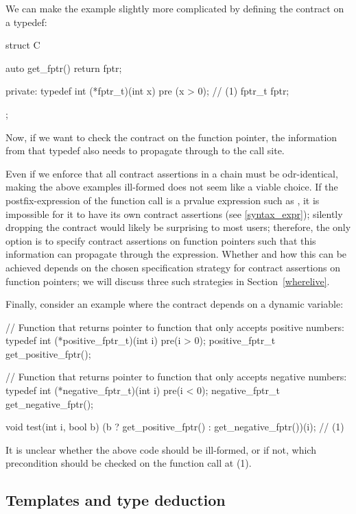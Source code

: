 We can make the example slightly more complicated by defining the contract on a typedef:
\begin{codeblock}
struct C {
  auto get_fptr() { return fptr; }
  
private:
  typedef int (*fptr_t)(int x) pre (x > 0);  // (1)
  fptr_t fptr;
};
\end{codeblock}
Now, if  we want to check the contract on the function pointer, the information from that typedef also needs to propagate through to the call site.

Even if we enforce that all contract assertions in a chain must be odr-identical, making the above examples ill-formed does not seem like a viable choice. If the postfix-expression of the function call is a prvalue expression such as , it is impossible for it to have its own contract assertions (see \ref{syntax_expr}); silently dropping the contract would likely be surprising to most users; therefore, the only option is to specify contract assertions on function pointers such that this information can propagate through the expression. Whether and how this can be achieved depends on the chosen specification strategy for contract assertions on function pointers; we will discuss three such strategies in Section~\ref{wherelive}.

Finally, consider an example where the contract depends on a dynamic variable:
\begin{codeblock}
// Function that returns pointer to function that only accepts positive numbers:
typedef int (*positive_fptr_t)(int i) pre(i > 0);
positive_fptr_t get_positive_fptr();

// Function that returns pointer to function that only accepts negative numbers:
typedef int (*negative_fptr_t)(int i) pre(i < 0);
negative_fptr_t get_negative_fptr();

void test(int i, bool b) {
  (b ? get_positive_fptr() : get_negative_fptr())(i);  // (1)
}
\end{codeblock}
It is unclear whether the above code should be ill-formed, or if not, which precondition should be checked on the function call at (1).


\subsection{Templates and type deduction}
\label{semantic_templates}

